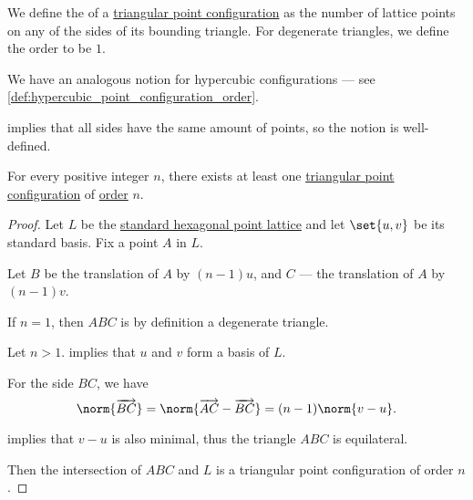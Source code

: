 \begin{definition}\label{def:triangular_point_configuration_order}\mimprovised
  We define the  of a \hyperref[def:triangular_point_configuration]{triangular point configuration} as the number of lattice points on any of the sides of its bounding triangle. For degenerate triangles, we define the order to be \( 1 \).
\end{definition}
\begin{comments}
  \item We have an analogous notion for hypercubic configurations --- see \cref{def:hypercubic_point_configuration_order}.
\end{comments}
\begin{defproof}
   implies that all sides have the same amount of points, so the notion is well-defined.
\end{defproof}

\begin{proposition}\label{thm:triangular_point_configuration_existence}
  For every positive integer \( n \), there exists at least one \hyperref[def:triangular_point_configuration]{triangular point configuration} of \hyperref[def:triangular_point_configuration_order]{order} \( n \).
\end{proposition}
\begin{proof}
  Let \( L \) be the \hyperref[def:hexagonal_point_lattice]{standard hexagonal point lattice} and let \( \set{ u, v } \) be its standard basis. Fix a point \( A \) in \( L \).

  Let \( B \) be the translation of \( A \) by \( (n - 1)u \), and \( C \) --- the translation of \( A \) by \( (n - 1)v \).

  If \( n = 1 \), then \( ABC \) is by definition a degenerate triangle.

  Let \( n > 1 \).  implies that \( u \) and \( v \) form a basis of \( L \).

  For the side \( BC \), we have
  \begin{equation*}
    \norm{\vect{BC}} = \norm{\vect{AC} - \vect{BC}} = (n - 1) \norm{v - u}.
  \end{equation*}

   implies that \( v - u \) is also minimal, thus the triangle \( ABC \) is equilateral.

  Then the intersection of \( ABC \) and \( L \) is a triangular point configuration of order \( n \).
\end{proof}

